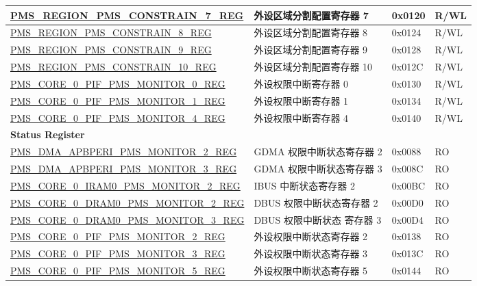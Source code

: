 \begin{longtable}{ | p{9.5cm} | p{7.5cm} | p{2cm} | p{} | }
\hyperref[regdesc:PMSREGIONPMSCONSTRAIN7REG]{PMS\_REGION\_PMS\_CONSTRAIN\_7\_REG} & 外设区域分割配置寄存器 7 & 0x0120 & R/WL \\ \hline
\hyperref[regdesc:PMSREGIONPMSCONSTRAIN8REG]{PMS\_REGION\_PMS\_CONSTRAIN\_8\_REG} & 外设区域分割配置寄存器 8 & 0x0124 & R/WL \\ \hline
\hyperref[regdesc:PMSREGIONPMSCONSTRAIN9REG]{PMS\_REGION\_PMS\_CONSTRAIN\_9\_REG} & 外设区域分割配置寄存器 9 & 0x0128 & R/WL \\ \hline
\hyperref[regdesc:PMSREGIONPMSCONSTRAIN10REG]{PMS\_REGION\_PMS\_CONSTRAIN\_10\_REG} & 外设区域分割配置寄存器 10 & 0x012C & R/WL \\ \hline
\hyperref[regdesc:PMSCORE0PIFPMSMONITOR0REG]{PMS\_CORE\_0\_PIF\_PMS\_MONITOR\_0\_REG} & 外设权限中断寄存器 0 & 0x0130 & R/WL \\ \hline
\hyperref[regdesc:PMSCORE0PIFPMSMONITOR1REG]{PMS\_CORE\_0\_PIF\_PMS\_MONITOR\_1\_REG} & 外设权限中断寄存器 1 & 0x0134 & R/WL \\ \hline
\hyperref[regdesc:PMSCORE0PIFPMSMONITOR4REG]{PMS\_CORE\_0\_PIF\_PMS\_MONITOR\_4\_REG} & 外设权限中断寄存器 4 & 0x0140 & R/WL \\ \hline
\multicolumn{4}{|l|}{\textbf{Status Register}} \\ \hline
\hyperref[regdesc:PMSDMAAPBPERIPMSMONITOR2REG]{PMS\_DMA\_APBPERI\_PMS\_MONITOR\_2\_REG} & GDMA 权限中断状态寄存器 2 & 0x0088 & RO \\ \hline
\hyperref[regdesc:PMSDMAAPBPERIPMSMONITOR3REG]{PMS\_DMA\_APBPERI\_PMS\_MONITOR\_3\_REG} & GDMA 权限中断状态寄存器 3 & 0x008C & RO \\ \hline
\hyperref[regdesc:PMSCORE0IRAM0PMSMONITOR2REG]{PMS\_CORE\_0\_IRAM0\_PMS\_MONITOR\_2\_REG} & IBUS 中断状态寄存器 2 & 0x00BC & RO \\ \hline
\hyperref[regdesc:PMSCORE0DRAM0PMSMONITOR2REG]{PMS\_CORE\_0\_DRAM0\_PMS\_MONITOR\_2\_REG} & DBUS 权限中断状态寄存器 2 & 0x00D0 & RO \\ \hline
\hyperref[regdesc:PMSCORE0DRAM0PMSMONITOR3REG]{PMS\_CORE\_0\_DRAM0\_PMS\_MONITOR\_3\_REG} & DBUS 权限中断状态 寄存器 3 & 0x00D4 & RO \\ \hline
\hyperref[regdesc:PMSCORE0PIFPMSMONITOR2REG]{PMS\_CORE\_0\_PIF\_PMS\_MONITOR\_2\_REG} & 外设权限中断状态寄存器 2 & 0x0138 & RO \\ \hline
\hyperref[regdesc:PMSCORE0PIFPMSMONITOR3REG]{PMS\_CORE\_0\_PIF\_PMS\_MONITOR\_3\_REG} & 外设权限中断状态寄存器 3 & 0x013C & RO \\ \hline
\hyperref[regdesc:PMSCORE0PIFPMSMONITOR5REG]{PMS\_CORE\_0\_PIF\_PMS\_MONITOR\_5\_REG} & 外设权限中断状态寄存器 5 & 0x0144 & RO \\ \hline

\end{longtable}
